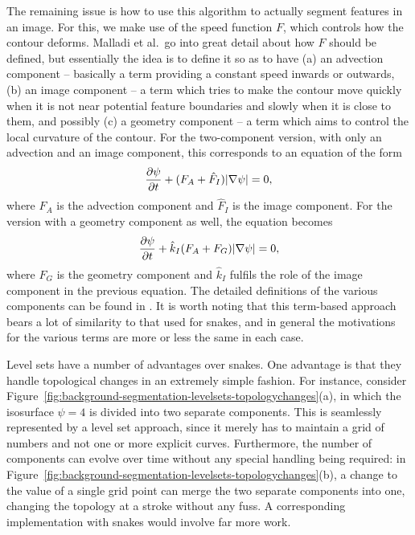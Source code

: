 The remaining issue is how to use this algorithm to actually segment features in an image. For this, we make use of the speed function $F$, which controls how the contour deforms. Malladi et al.\ go into great detail about how $F$ should be defined, but essentially the idea is to define it so as to have (a) an advection component -- basically a term providing a constant speed inwards or outwards, (b) an image component -- a term which tries to make the contour move quickly when it is not near potential feature boundaries and slowly when it is close to them, and possibly (c) a geometry component -- a term which aims to control the local curvature of the contour. For the two-component version, with only an advection and an image component, this corresponds to an equation of the form
%
\[
\frac{\partial \psi}{\partial t} + (F_A + \hat{F}_I)|\nabla \psi| = 0,
\]
%
where $F_A$ is the advection component and $\hat{F}_I$ is the image component. For the version with a geometry component as well, the equation becomes
%
\[
\frac{\partial \psi}{\partial t} + \hat{k}_I(F_A + F_G)|\nabla \psi| = 0,
\]
%
where $F_G$ is the geometry component and $\hat{k}_I$ fulfils the role of the image component in the previous equation. The detailed definitions of the various components can be found in \cite{malladi95}. It is worth noting that this term-based approach bears a lot of similarity to that used for snakes, and in general the motivations for the various terms are more or less the same in each case.

Level sets have a number of advantages over snakes. One advantage is that they handle topological changes in an extremely simple fashion. For instance, consider Figure~\ref{fig:background-segmentation-levelsets-topologychanges}(a), in which the isosurface $\psi = 4$ is divided into two separate components. This is seamlessly represented by a level set approach, since it merely has to maintain a grid of numbers and not one or more explicit curves. Furthermore, the number of components can evolve over time without any special handling being required: in Figure~\ref{fig:background-segmentation-levelsets-topologychanges}(b), a change to the value of a single grid point can merge the two separate components into one, changing the topology at a stroke without any fuss. A corresponding implementation with snakes would involve far more work.

